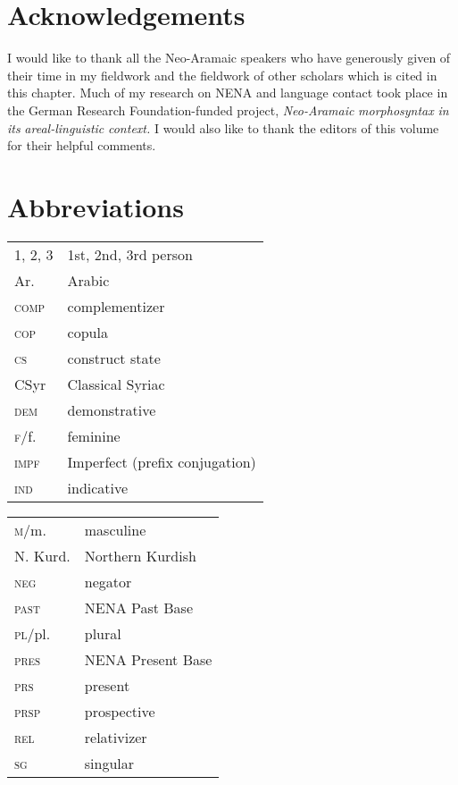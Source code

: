 \documentclass[output=paper]{langsci/langscibook}
\begin{document}
\section*{Acknowledgements}

I would like to thank all the Neo-Aramaic speakers who have generously given of their time in my fieldwork and the fieldwork of other scholars which is cited in this chapter. Much of my research on NENA and language contact took place in the German Research Foundation-funded project, \textit{Neo-Aramaic} \textit{morphosyntax} \textit{in} \textit{its} \textit{areal-linguistic} \textit{context.} I would also like to thank the editors of this volume for their helpful comments.

\section*{Abbreviations}

\begin{tabularx}{.5\textwidth}{@{}lQ@{}}
\textsc{1, 2, 3} & 1st, 2nd, 3rd person \\
Ar.            & Arabic\\
\textsc{comp}    & complementizer\\
\textsc{cop}     & copula\\
\textsc{cs}     & construct state\\
CSyr           & Classical Syriac\\
\textsc{dem}     & demonstrative \\
\textsc{f}/f.    & feminine\\
\textsc{impf}   & Imperfect (prefix conjugation)\\
\textsc{ind}     & indicative\\
\end{tabularx}%
\begin{tabularx}{.5\textwidth}{@{}lQ@{}}
\textsc{m}/m.    & masculine\\
N. Kurd.        & Northern Kurdish \\ 
\textsc{neg}    & negator\\
\textsc{past}   & NENA Past Base\\
\textsc{pl}/pl.  & plural\\
\textsc{pres}    & NENA Present Base \\
\textsc{prs}    & present \\
\textsc{prsp}    & prospective \\
\textsc{rel}     & relativizer\\
\textsc{sg}  & singular
\end{tabularx}%
\end{document}
